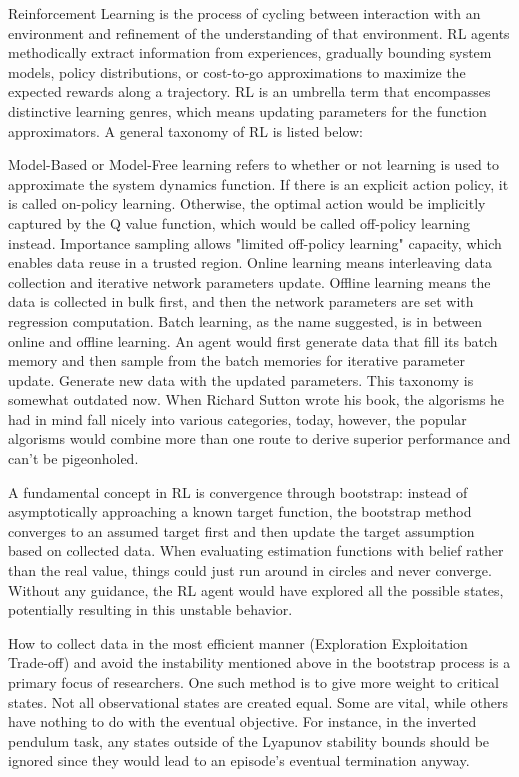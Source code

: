 Reinforcement Learning is the process of cycling between interaction with an environment and refinement of the understanding of that environment. RL agents methodically extract information from experiences, gradually bounding system models, policy distributions, or cost-to-go approximations to maximize the expected rewards along a trajectory. RL is an umbrella term that encompasses distinctive learning genres, which means updating parameters for the function approximators. A general taxonomy of RL is listed below:

Model-Based or Model-Free learning refers to whether or not learning is used to approximate the system dynamics function. If there is an explicit action policy, it is called on-policy learning. Otherwise, the optimal action would be implicitly captured by the Q value function, which would be called off-policy learning instead. Importance sampling allows "limited off-policy learning" capacity, which enables data reuse in a trusted region. Online learning means interleaving data collection and iterative network parameters update. Offline learning means the data is collected in bulk first, and then the network parameters are set with regression computation. Batch learning, as the name suggested, is in between online and offline learning. An agent would first generate data that fill its batch memory and then sample from the batch memories for iterative parameter update. Generate new data with the updated parameters. This taxonomy is somewhat outdated now. When Richard Sutton wrote his book\cite{Sutton1998IntroductionTR}, the algorisms he had in mind fall nicely into various categories, today, however, the popular algorisms would combine more than one route to derive superior performance and can't be pigeonholed.

A fundamental concept in RL is convergence through bootstrap: instead of asymptotically approaching a known target function, the bootstrap method converges to an assumed target first and then update the target assumption based on collected data. When evaluating estimation functions with belief rather than the real value, things could just run around in circles and never converge. Without any guidance, the RL agent would have explored all the possible states, potentially resulting in this unstable behavior. 

How to collect data in the most efficient manner (Exploration Exploitation Trade-off) and avoid the instability mentioned above in the bootstrap process is a primary focus of researchers. One such method is to give more weight to critical states. Not all observational states are created equal. Some are vital, while others have nothing to do with the eventual objective. For instance, in the inverted pendulum task, any states outside of the Lyapunov stability bounds should be ignored since they would lead to an episode's eventual termination anyway.  

